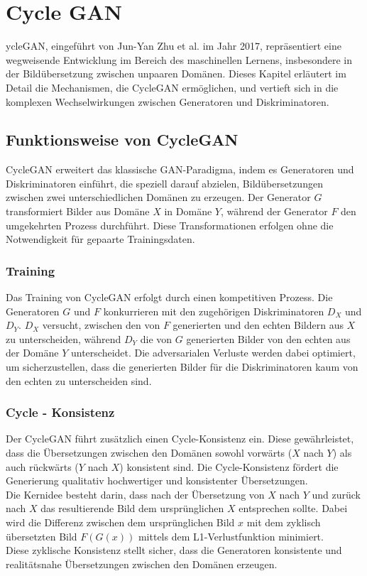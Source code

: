 \chapter*{Cycle GAN}

ycleGAN, eingeführt von Jun-Yan Zhu et al. im Jahr 2017, repräsentiert eine wegweisende Entwicklung im Bereich des maschinellen Lernens, insbesondere in der Bildübersetzung zwischen unpaaren Domänen. Dieses Kapitel erläutert im Detail die Mechanismen, die CycleGAN ermöglichen, und vertieft sich in die komplexen Wechselwirkungen zwischen Generatoren und Diskriminatoren. 

\section*{Funktionsweise von CycleGAN}

CycleGAN erweitert das klassische GAN-Paradigma, indem es Generatoren und Diskriminatoren einführt, die speziell darauf abzielen, Bildübersetzungen zwischen zwei unterschiedlichen Domänen zu erzeugen. Der Generator $G$ transformiert Bilder aus Domäne $X$ in Domäne $Y$, während der Generator $F$ den umgekehrten Prozess durchführt. Diese Transformationen erfolgen ohne die Notwendigkeit für gepaarte Trainingsdaten.

\subsection*{Training}
Das Training von CycleGAN erfolgt durch einen kompetitiven Prozess. Die Generatoren $G$ und $F$ konkurrieren mit den zugehörigen Diskriminatoren $D_X$ und $D_Y$. $D_X$ versucht, zwischen den von $F$ generierten und den echten Bildern aus $X$ zu unterscheiden, während $D_Y$ die von $G$ generierten Bilder von den echten aus der Domäne $Y$ unterscheidet. Die adversarialen Verluste werden dabei optimiert, um sicherzustellen, dass die generierten Bilder für die Diskriminatoren kaum von den echten zu unterscheiden sind.

\subsection*{Cycle - Konsistenz}
Der CycleGAN führt zusätzlich einen Cycle-Konsistenz ein. Diese gewährleistet, dass die Übersetzungen zwischen den Domänen sowohl vorwärts ($X$ nach $Y$) als auch rückwärts ($Y$ nach $X$) konsistent sind. Die Cycle-Konsistenz fördert die Generierung qualitativ hochwertiger und konsistenter Übersetzungen.
\\
Die Kernidee besteht darin, dass nach der Übersetzung von $X$ nach $Y$ und zurück nach $X$ das resultierende Bild dem ursprünglichen $X$ entsprechen sollte. Dabei wird die Differenz zwischen dem ursprünglichen Bild $x$ mit dem zyklisch übersetzten Bild $F(G(x))$ mittels dem L1-Verlustfunktion minimiert. 
\\
Diese zyklische Konsistenz stellt sicher, dass die Generatoren konsistente und realitätsnahe Übersetzungen zwischen den Domänen erzeugen.


